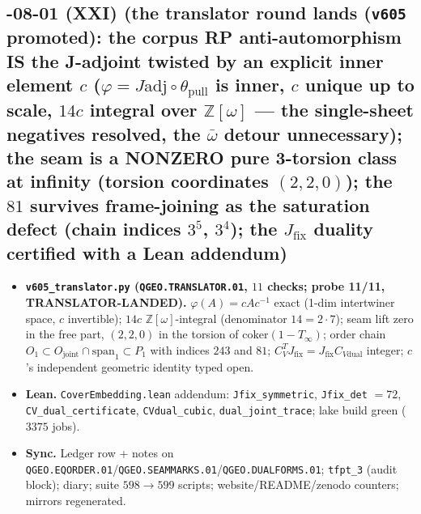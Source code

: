 \subsection*{-08-01 (XXI) (the translator round lands (\texttt{v605} promoted): the corpus RP anti-automorphism IS the J-adjoint twisted by an explicit inner element $c$ ($\varphi=J\mathrm{adj}\circ\theta_{\mathrm{pull}}$ is inner, $c$ unique up to scale, $14c$ integral over $\mathbb{Z}[\omega]$ --- the single-sheet negatives resolved, the $\bar\omega$ detour unnecessary); the seam is a NONZERO pure 3-torsion class at infinity (torsion coordinates $(2,2,0)$); the $81$ survives frame-joining as the saturation defect (chain indices $3^5$, $3^4$); the $J_{\mathrm{fix}}$ duality certified with a Lean addendum)}
\begin{itemize}[leftmargin=1.5em]
\item \textbf{\texttt{v605\_translator.py} (\texttt{QGEO.TRANSLATOR.01}, $11$ checks; probe
11/11, TRANSLATOR-LANDED).} $\varphi(A)=cAc^{-1}$ exact (1-dim intertwiner space, $c$
invertible); $14c$ $\mathbb{Z}[\omega]$-integral (denominator $14=2\cdot7$); seam lift zero
in the free part, $(2,2,0)$ in the torsion of $\mathrm{coker}(1-T_\infty)$; order chain
$O_1\subset O_{\mathrm{joint}}\cap\mathrm{span}_1\subset P_1$ with indices $243$ and $81$;
$C_V^TJ_{\mathrm{fix}}=J_{\mathrm{fix}}C_{V\mathrm{dual}}$ integer; $c$'s independent
geometric identity typed open.
\item \textbf{Lean.} \texttt{CoverEmbedding.lean} addendum: \texttt{Jfix\_symmetric},
\texttt{Jfix\_det} $=72$, \texttt{CV\_dual\_certificate}, \texttt{CVdual\_cubic},
\texttt{dual\_joint\_trace}; lake build green ($3375$ jobs).
\item \textbf{Sync.} Ledger row + notes on
\texttt{QGEO.EQORDER.01}/\texttt{QGEO.SEAMMARKS.01}/\texttt{QGEO.DUALFORMS.01};
\texttt{tfpt\_3} (audit block); diary; suite $598\to599$ scripts; website/README/zenodo
counters; mirrors regenerated.
\end{itemize}

